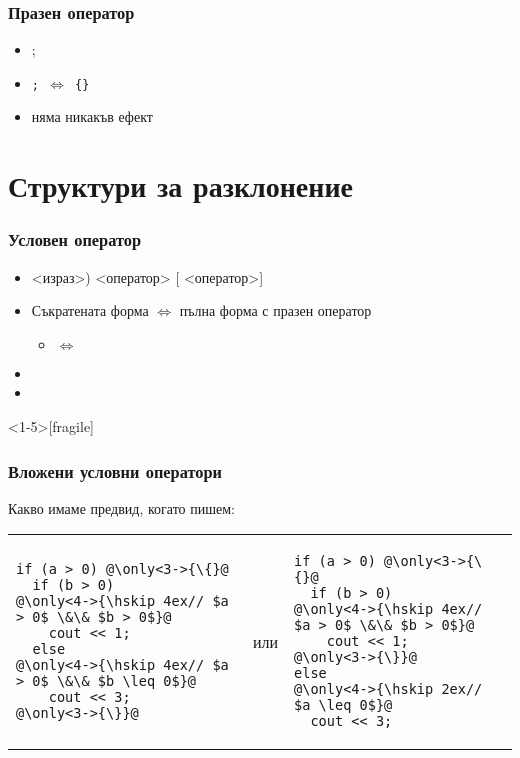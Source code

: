 \documentclass{beamer}
\begin{document}
\begin{frame}
  \frametitle{Празен оператор}
  \begin{itemize}
  \item \tta;
  \item \tt; $\Leftrightarrow$ \tt{\{\}}
  \item няма никакъв ефект
  \end{itemize}
\end{frame}

\section{Структури за разклонение}

\begin{frame}
  \frametitle{Условен оператор}

  \begin{itemize}[<+->]
  \item {}<израз>\tta) <оператор> [ <оператор>]
  \item Съкратената форма $\Leftrightarrow$ пълна форма с празен оператор
    \begin{itemize}
    \item {} $\Leftrightarrow$ 
    \end{itemize}
  \item \exa {}
  \item \exa {}
  \end{itemize}
\end{frame}

\begin{frame}<1-5>[fragile]
  \frametitle{Вложени условни оператори}

  Какво имаме предвид, когато пишем:
  \\[1em]
  \pause
  \begin{tabular}{l@{\hskip 12ex}c@{\hskip 12ex}l}
\begin{lstlisting}
if (a > 0) @\only<3->{\{}@
  if (b > 0)
@\only<4->{\hskip 4ex// $a > 0$ \&\& $b > 0$}@
    cout << 1;
  else
@\only<4->{\hskip 4ex// $a > 0$ \&\& $b \leq 0$}@
    cout << 3;
@\only<3->{\}}@
\end{lstlisting}%
    &или&%
\begin{lstlisting}
if (a > 0) @\only<3->{\{}@
  if (b > 0)
@\only<4->{\hskip 4ex// $a > 0$ \&\& $b > 0$}@
    cout << 1;
@\only<3->{\}}@
else
@\only<4->{\hskip 2ex// $a \leq 0$}@
  cout << 3;
\end{lstlisting}
  \end{tabular}
\end{frame}
\end{document}
